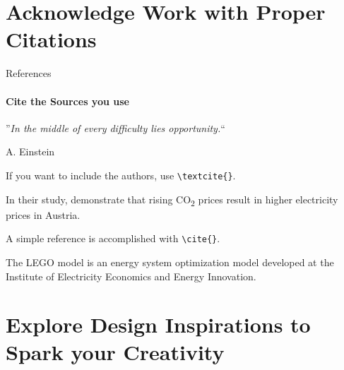 \documentclass[aspectratio=169]{beamer}
\begin{document}
\section{\textbf{Acknowledge} Work with Proper \textbf{Citations}}

\begin{frame}
\end{frame}


\begin{frame}{References}
    \framesubtitle{Cite the Sources you use}

    
    \begin{coloredblock}[grey]
        \centering
        ”\textit{In the middle of every difficulty lies opportunity.}“
          
        \vspace{0.7cm}
        \scriptsize A. Einstein \cite{einstein2018}
    \end{coloredblock}
    
    \begin{coloredblock}
        If you want to include the authors, use \texttt{\textbackslash textcite\{\}}.
    
        \vspace{0.5cm}
        In their study, \textbf{\textcite{gaugl2023}} demonstrate that rising CO\textsubscript{2} prices result in higher electricity prices in Austria.
    \end{coloredblock}
    
    \begin{coloredblock}
        A simple reference is accomplished with \texttt{\textbackslash cite\{\}}.
    
        \vspace{0.5cm}
        The LEGO model is an energy system optimization model developed at the Institute of Electricity Economics and Energy Innovation. \textbf{\cite{wogrin2022}}
    \end{coloredblock}

\end{frame}


\section{Explore \textbf{Design Inspirations} to Spark  your Creativity}
\end{document}
